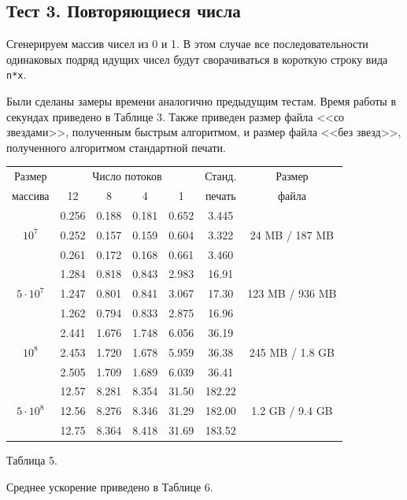 \subsection{Тест 3. Повторяющиеся числа}
Сгенерируем массив чисел из 0 и 1.
В этом случае все последовательности одинаковых подряд идущих чисел будут сворачиваться в короткую строку вида \texttt{n*x}.

Были сделаны замеры времени аналогично предыдущим тестам.
Время работы в секундах приведено в Таблице 3.
Также приведен размер файла <<со звездами>>, полученным быстрым алгоритмом, и размер файла <<без звезд>>, полученного алгоритмом стандартной печати.
\begin{center}
\begin{longtable}{||c|c|c|c|c|c|c||}
\hline
\hline
Размер & \multicolumn{4}{c|}{Число потоков} & Станд. & Размер \\
\hhline{~|-|-|-|-|~|~|}
массива & 12 & 8 & 4 & 1 & печать  & файла\\
\hline
\hline
& 0.256 & 0.188 & 0.181 & 0.652 & 3.445  &\\
\hhline{~|-|-|-|-|-|}
$10^7$ & 0.252 & 0.157 & 0.159 & 0.604 & 3.322  & 24 MB / 187 MB \\
\hhline{~|-|-|-|-|-|}
& 0.261 & 0.172 & 0.168 & 0.661 & 3.460  &\\
\hline
& 1.284 & 0.818 & 0.843 & 2.983 & 16.91  &\\
\hhline{~|-|-|-|-|-|}
$5 \cdot 10^7$ & 1.247 & 0.801 & 0.841 & 3.067 & 17.30  & 123 MB / 936 MB\\
\hhline{~|-|-|-|-|-|}
& 1.262 & 0.794 & 0.833 & 2.875 & 16.96 & \\
\hline
& 2.441 & 1.676 & 1.748 & 6.056 & 36.19 &\\
\hhline{~|-|-|-|-|-|}
$10^8$ & 2.453 & 1.720 & 1.678 & 5.959 & 36.38  & 245 MB / 1.8 GB\\
\hhline{~|-|-|-|-|-|}
& 2.505 & 1.709 & 1.689 & 6.039 &  36.41  &\\
\hline
& 12.57 & 8.281 & 8.354 & 31.50 & 182.22  &\\
\hhline{~|-|-|-|-|-|}
$5 \cdot 10^8$ & 12.56 & 8.276 & 8.346 & 31.29 & 182.00  & 1.2 GB / 9.4 GB\\
\hhline{~|-|-|-|-|-|}
& 12.75  & 8.364 & 8.418 & 31.69 & 183.52  &\\
\hline
\hline
\end{longtable}
\small{Таблица 5.}
\end{center}

Среднее ускорение приведено в Таблице 6.

